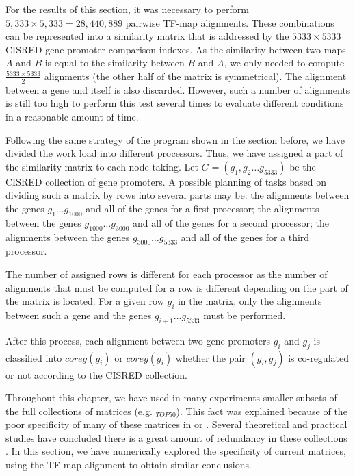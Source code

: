 
For the results of this section, it was necessary to perform 
$5,333 \times 5,333 = 28,440,889$ pairwise TF-map alignments. These combinations 
can be represented into a similarity matrix that is addressed by 
the $5333 \times 5333$ CISRED gene promoter comparison indexes. 
As the similarity between two maps $A$ and $B$ is equal to the
similarity between $B$ and $A$, we only needed to compute $\frac{5333 \times 5333}{2}$
alignments (the other half of the matrix is symmetrical). The alignment
between a gene and itself is also discarded. However, such a number of
alignments is still too high to perform this test several times to evaluate
different conditions in a reasonable amount of time. 

Following the same strategy of the program  shown in the section before, 
we have divided the work load into different processors. Thus, we have assigned
a part of the similarity matrix to each node taking. Let $G=(g_1,g_2 \ldots g_{5333})$ be
the CISRED collection of gene promoters. A possible planning of tasks based on dividing 
such a matrix by rows into several parts may be: the alignments between the genes 
$g_1 \ldots g_{1000}$ and all of the genes for a first processor; the alignments between the 
genes $g_{1000} \ldots g_{3000}$ and all of the genes for a second processor; the alignments 
between the genes $g_{3000} \ldots g_{5333}$ and all of the genes for a third processor.

The number of assigned rows is different for each processor as the number of alignments that must
be computed for a row is different depending on the part of the matrix is located. For a given 
row $g_i$ in the matrix, only the alignments between such a gene and the genes 
$g_{i+1} \ldots g_{5333}$ must be performed.

After this process, each alignment between two gene promoters $g_i$ and $g_j$ is classified
into $coreg(g_i)$ or $\overline{coreg}(g_i)$ whether the pair $(g_i,g_j)$ is co-regulated
or not according to the CISRED collection.

\clearpage
{}\label{sec:matrices}


Throughout this chapter, we have used in many experiments smaller subsets of the full collections 
of matrices (e.g. $_{TOP50}$). This fact was explained because of the poor specificity
of many of these matrices in  or . Several theoretical and practical studies 
have concluded there is a great amount of redundancy in these collections \citep{rahmann:2003a,schones:2005a}. 
In this section, we have numerically explored the specificity of current matrices, using the 
TF-map alignment to obtain similar conclusions.

